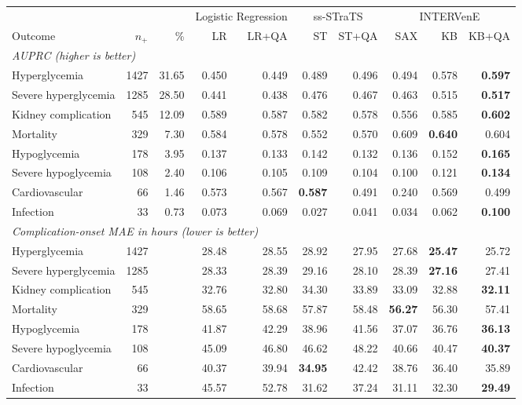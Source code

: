 \begin{tabular}{lrrrrrrrrr}
\toprule
 & & & \multicolumn{2}{c}{Logistic Regression} & \multicolumn{2}{c}{ss-STraTS} & \multicolumn{3}{c}{INTERVenE} \\
\cmidrule(lr){4-5}\cmidrule(lr){6-7}\cmidrule(lr){8-10}
Outcome & $n_+$ & \% & LR & LR+QA & ST & ST+QA & SAX & KB & KB+QA \\
\midrule
\multicolumn{10}{l}{\textit{AUPRC (higher is better)}} \\
Hyperglycemia & 1427 & 31.65 & 0.450 & 0.449 & 0.489 & 0.496 & 0.494 & 0.578 & \textbf{0.597} \\
Severe hyperglycemia & 1285 & 28.50 & 0.441 & 0.438 & 0.476 & 0.467 & 0.463 & 0.515 & \textbf{0.517} \\
Kidney complication & 545 & 12.09 & 0.589 & 0.587 & 0.582 & 0.578 & 0.556 & 0.585 & \textbf{0.602} \\
Mortality & 329 & 7.30 & 0.584 & 0.578 & 0.552 & 0.570 & 0.609 & \textbf{0.640} & 0.604 \\
Hypoglycemia & 178 & 3.95 & 0.137 & 0.133 & 0.142 & 0.132 & 0.136 & 0.152 & \textbf{0.165} \\
Severe hypoglycemia & 108 & 2.40 & 0.106 & 0.105 & 0.109 & 0.104 & 0.100 & 0.121 & \textbf{0.134} \\
Cardiovascular & 66 & 1.46 & 0.573 & 0.567 & \textbf{0.587} & 0.491 & 0.240 & 0.569 & 0.499 \\
Infection & 33 & 0.73 & 0.073 & 0.069 & 0.027 & 0.041 & 0.034 & 0.062 & \textbf{0.100} \\
\midrule
\multicolumn{10}{l}{\textit{Complication-onset MAE in hours (lower is better)}} \\
Hyperglycemia & 1427 &  & 28.48 & 28.55 & 28.92 & 27.95 & 27.68 & \textbf{25.47} & 25.72 \\
Severe hyperglycemia & 1285 &  & 28.33 & 28.39 & 29.16 & 28.10 & 28.39 & \textbf{27.16} & 27.41 \\
Kidney complication & 545 &  & 32.76 & 32.80 & 34.30 & 33.89 & 33.09 & 32.88 & \textbf{32.11} \\
Mortality & 329 &  & 58.65 & 58.68 & 57.87 & 58.48 & \textbf{56.27} & 56.30 & 57.41 \\
Hypoglycemia & 178 &  & 41.87 & 42.29 & 38.96 & 41.56 & 37.07 & 36.76 & \textbf{36.13} \\
Severe hypoglycemia & 108 &  & 45.09 & 46.80 & 46.62 & 48.22 & 40.66 & 40.47 & \textbf{40.37} \\
Cardiovascular & 66 &  & 40.37 & 39.94 & \textbf{34.95} & 42.42 & 38.76 & 36.40 & 35.89 \\
Infection & 33 &  & 45.57 & 52.78 & 31.62 & 37.24 & 31.11 & 32.30 & \textbf{29.49} \\
\bottomrule
\end{tabular}
